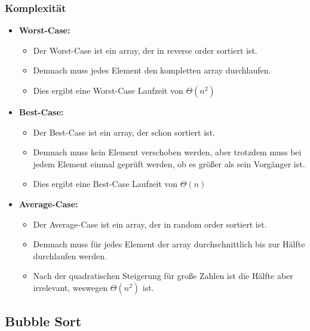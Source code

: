 \documentclass[
../../AuD-Zusammenfassung.tex,
]
{subfiles}
\begin{document}
\subsubsection{Komplexität}
\begin{itemize}
    \item \textbf{Worst-Case:}
    \begin{itemize}
        \item Der Worst-Case ist ein array, der in reverse order sortiert ist. 
        \item Demnach muss jedes Element den kompletten array durchlaufen.
        \item Dies ergibt eine Worst-Case Laufzeit von $\Theta(n^2)$
    \end{itemize}
    \item \textbf{Best-Case:}
    \begin{itemize}
        \item Der Best-Case ist ein array, der schon sortiert ist.
        \item Demnach muss kein Element verschoben werden, aber trotzdem muss bei jedem Element einmal geprüft werden, ob es größer als sein Vorgänger ist.
        \item Dies ergibt eine Best-Case Laufzeit von $\Theta(n)$
    \end{itemize}
    \item \textbf{Average-Case:}
    \begin{itemize}
        \item Der Average-Case ist ein array, der in random order sortiert ist.
        \item Demnach muss für jedes Element der array durchschnittlich bis zur Hälfte durchlaufen werden.
        \item Nach der quadratischen Steigerung für große Zahlen ist die Hälfte aber irrelevant, weswegen $\Theta(n^2)$ ist.
    \end{itemize}
\end{itemize}


\subsection{Bubble Sort}

\end{document}
